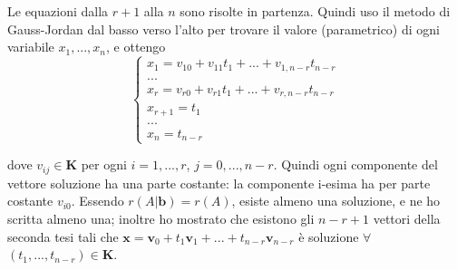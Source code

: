 \documentclass{article}
\begin{document}
Le equazioni dalla $r+1$ alla $n$ sono risolte in partenza. Quindi uso il
metodo di Gauss-Jordan dal basso verso l'alto per trovare il valore
(parametrico) di ogni variabile $x_{1},...,x_{n}$, e ottengo%
\begin{equation*}
\left\{ 
\begin{array}{c}
x_{1}=v_{10}+v_{11}t_{1}+...+v_{1,n-r}t_{n-r} \\ 
... \\ 
x_{r}=v_{r0}+v_{r1}t_{1}+...+v_{r,n-r}t_{n-r} \\ 
x_{r+1}=t_{1} \\ 
... \\ 
x_{n}=t_{n-r}%
\end{array}%
\right.
\end{equation*}

dove $v_{ij}\in \mathbf{K}$ per ogni $i=1,...,r$, $j=0,...,n-r$. Quindi ogni
componente del vettore soluzione ha una parte costante: la componente
i-esima ha per parte costante $v_{i0}$. Essendo $r\left( A|\mathbf{b}\right)
=r\left( A\right) $, esiste almeno una soluzione, e ne ho scritta almeno
una; inoltre ho mostrato che esistono gli $n-r+1$ vettori della seconda tesi
tali che $\mathbf{x}=\mathbf{v}_{0}+t_{1}\mathbf{v}_{1}+...+t_{n-r}\mathbf{v}%
_{n-r}$ \`{e} soluzione $\forall $ $\left( t_{1},...,t_{n-r}\right) \in 
\mathbf{K}$. 
\end{document}
